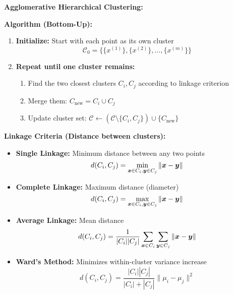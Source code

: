 \begin{seanbox}{4.2}
\textbf{Agglomerative Hierarchical Clustering:}

\textbf{Algorithm (Bottom-Up):}

\begin{enumerate}
    \item \textbf{Initialize:} Start with each point as its own cluster
    \begin{equation}
        \mathcal{C}_0 = \{\{x^{(1)}\}, \{x^{(2)}\}, \ldots, \{x^{(m)}\}\}
    \end{equation}
    
    \item \textbf{Repeat until one cluster remains:}
    \begin{enumerate}
        \item Find the two closest clusters $C_i, C_j$ according to linkage criterion
        \item Merge them: $C_{\text{new}} = C_i \cup C_j$
        \item Update cluster set: $\mathcal{C} \leftarrow (\mathcal{C} \setminus \{C_i, C_j\}) \cup \{C_{\text{new}}\}$
    \end{enumerate}
\end{enumerate}

\textbf{Linkage Criteria (Distance between clusters):}

\begin{itemize}
    \item \textbf{Single Linkage:} Minimum distance between any two points
    \begin{equation}
        d(C_i, C_j) = \min_{\bm{x} \in C_i, \bm{y} \in C_j} \|\bm{x} - \bm{y}\|
    \end{equation}
    
    \item \textbf{Complete Linkage:} Maximum distance (diameter)
    \begin{equation}
        d(C_i, C_j) = \max_{\bm{x} \in C_i, \bm{y} \in C_j} \|\bm{x} - \bm{y}\|
    \end{equation}
    
    \item \textbf{Average Linkage:} Mean distance
    \begin{equation}
        d(C_i, C_j) = \frac{1}{|C_i||C_j|} \sum_{\bm{x} \in C_i} \sum_{\bm{y} \in C_j} \|\bm{x} - \bm{y}\|
    \end{equation}
    
    \item \textbf{Ward's Method:} Minimizes within-cluster variance increase
    \begin{equation}
        d(C_i, C_j) = \frac{|C_i||C_j|}{|C_i| + |C_j|} \|\mu_i - \mu_j\|^2
    \end{equation}
\end{itemize}
\end{seanbox}

